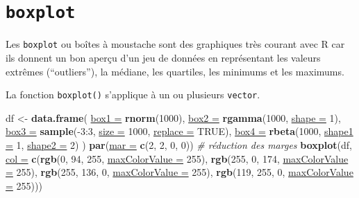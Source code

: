 \documentclass[twoside,symmetric]{book}
\newenvironment{Shaded}{}{}
\newcommand{\CommentTok}[1]{\textit{#1}}
\newcommand{\DataTypeTok}[1]{\underline{#1}}
\newcommand{\DecValTok}[1]{#1}
\newcommand{\KeywordTok}[1]{\textbf{#1}}
\newcommand{\NormalTok}[1]{#1}
\newcommand{\OperatorTok}[1]{#1}
\newcommand{\OtherTok}[1]{#1}
\newcommand{\StringTok}[1]{#1}
\begin{document}
\hypertarget{graph1boxplot}{%
\section{\texorpdfstring{\texttt{boxplot}}{boxplot}}\label{graph1boxplot}}

Les \texttt{boxplot} ou boîtes à moustache sont des graphiques très courant avec R car ils donnent un bon aperçu d'un jeu de données en représentant les valeurs extrêmes (``outliers''), la médiane, les quartiles, les minimums et les maximums.

La fonction \texttt{boxplot()} s'applique à un ou plusieurs \texttt{vector}.

\begin{Shaded}
\begin{Highlighting}[]
\NormalTok{df <-}\StringTok{ }\KeywordTok{data.frame}\NormalTok{(}
  \DataTypeTok{box1 =} \KeywordTok{rnorm}\NormalTok{(}\DecValTok{1000}\NormalTok{), }
  \DataTypeTok{box2 =} \KeywordTok{rgamma}\NormalTok{(}\DecValTok{1000}\NormalTok{, }\DataTypeTok{shape =} \DecValTok{1}\NormalTok{), }
  \DataTypeTok{box3 =} \KeywordTok{sample}\NormalTok{(}\OperatorTok{-}\DecValTok{3}\OperatorTok{:}\DecValTok{3}\NormalTok{, }\DataTypeTok{size =} \DecValTok{1000}\NormalTok{, }\DataTypeTok{replace =} \OtherTok{TRUE}\NormalTok{),}
  \DataTypeTok{box4 =} \KeywordTok{rbeta}\NormalTok{(}\DecValTok{1000}\NormalTok{, }\DataTypeTok{shape1 =} \DecValTok{1}\NormalTok{, }\DataTypeTok{shape2 =} \DecValTok{2}\NormalTok{)}
\NormalTok{)}
\KeywordTok{par}\NormalTok{(}\DataTypeTok{mar =} \KeywordTok{c}\NormalTok{(}\DecValTok{2}\NormalTok{, }\DecValTok{2}\NormalTok{, }\DecValTok{0}\NormalTok{, }\DecValTok{0}\NormalTok{)) }\CommentTok{# réduction des marges}
\KeywordTok{boxplot}\NormalTok{(df, }\DataTypeTok{col =} \KeywordTok{c}\NormalTok{(}\KeywordTok{rgb}\NormalTok{(}\DecValTok{0}\NormalTok{, }\DecValTok{94}\NormalTok{, }\DecValTok{255}\NormalTok{, }\DataTypeTok{maxColorValue =} \DecValTok{255}\NormalTok{),  }
  \KeywordTok{rgb}\NormalTok{(}\DecValTok{255}\NormalTok{, }\DecValTok{0}\NormalTok{, }\DecValTok{174}\NormalTok{, }\DataTypeTok{maxColorValue =} \DecValTok{255}\NormalTok{),  }
  \KeywordTok{rgb}\NormalTok{(}\DecValTok{255}\NormalTok{, }\DecValTok{136}\NormalTok{, }\DecValTok{0}\NormalTok{, }\DataTypeTok{maxColorValue =} \DecValTok{255}\NormalTok{),  }
  \KeywordTok{rgb}\NormalTok{(}\DecValTok{119}\NormalTok{, }\DecValTok{255}\NormalTok{, }\DecValTok{0}\NormalTok{, }\DataTypeTok{maxColorValue =} \DecValTok{255}\NormalTok{)))}
\end{Highlighting}
\end{Shaded}
\end{document}
